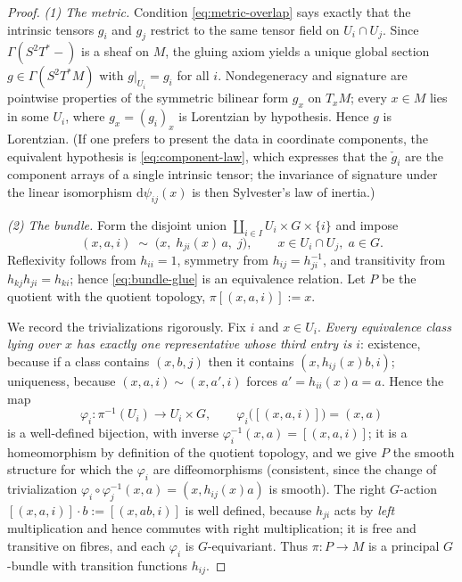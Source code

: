 \documentclass[11pt,a4paper]{article}
\theoremstyle{plain}
\theoremstyle{definition}
\theoremstyle{remark}
\begin{document}
\begin{proof}
\emph{(1) The metric.}
Condition \eqref{eq:metric-overlap} says exactly that the intrinsic tensors $g_i$ and $g_j$
restrict to the same tensor field on $U_i\cap U_j$. Since $\Gamma(S^2T^*-)$ is a sheaf on $M$, the
gluing axiom yields a unique global section $g\in\Gamma(S^2T^*M)$ with $g|_{U_i}=g_i$ for all $i$.
Nondegeneracy and signature are pointwise properties of the symmetric bilinear form $g_x$ on
$T_xM$; every $x\in M$ lies in some $U_i$, where $g_x=(g_i)_x$ is Lorentzian by hypothesis. Hence
$g$ is Lorentzian. (If one prefers to present the data in coordinate components, the equivalent
hypothesis is \eqref{eq:component-law}, which expresses that the $\check g_i$ are the component
arrays of a single intrinsic tensor; the invariance of signature under the linear isomorphism
$\mathrm{d}\psi_{ij}(x)$ is then Sylvester's law of inertia.)

\emph{(2) The bundle.}
Form the disjoint union $\coprod_{i\in I}U_i\times G\times\{i\}$ and impose
\begin{equation}
\label{eq:bundle-glue}
(x,a,i)\;\sim\;\bigl(x,\;h_{ji}(x)\,a,\;j\bigr),
\qquad x\in U_i\cap U_j,\; a\in G .
\end{equation}
Reflexivity follows from $h_{ii}=1$, symmetry from $h_{ij}=h_{ji}^{-1}$, and transitivity from
$h_{kj}h_{ji}=h_{ki}$; hence \eqref{eq:bundle-glue} is an equivalence relation. Let $P$ be the
quotient with the quotient topology, $\pi[(x,a,i)]:=x$.

We record the trivializations rigorously. Fix $i$ and $x\in U_i$. \emph{Every equivalence class
lying over $x$ has exactly one representative whose third entry is $i$}: existence, because if a
class contains $(x,b,j)$ then it contains $(x,h_{ij}(x)b,i)$; uniqueness, because
$(x,a,i)\sim(x,a',i)$ forces $a'=h_{ii}(x)a=a$. Hence the map
\begin{equation}
\label{eq:triv}
\varphi_i\colon \pi^{-1}(U_i)\longrightarrow U_i\times G,
\qquad
\varphi_i\bigl([(x,a,i)]\bigr)=(x,a)
\end{equation}
is a well-defined bijection, with inverse $\varphi_i^{-1}(x,a)=[(x,a,i)]$; it is a homeomorphism
by definition of the quotient topology, and we give $P$ the smooth structure for which the
$\varphi_i$ are diffeomorphisms (consistent, since the change of trivialization
$\varphi_i\circ\varphi_j^{-1}(x,a)=(x,h_{ij}(x)a)$ is smooth). The right $G$-action
$[(x,a,i)]\cdot b:=[(x,ab,i)]$ is well defined, because $h_{ji}$ acts by \emph{left}
multiplication and hence commutes with right multiplication; it is free and transitive on fibres,
and each $\varphi_i$ is $G$-equivariant. Thus $\pi\colon P\to M$ is a principal $G$-bundle with
transition functions $h_{ij}$.


\end{proof}
\end{document}

